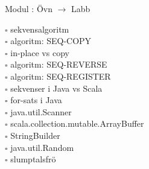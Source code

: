 
Modul : Övn  $\rightarrow$ Labb 
\begin{multicols}{3}\SlideFontTiny
$\square$ sekvensalgoritm \\
$\square$ algoritm: SEQ-COPY \\
$\square$ in-place vs copy \\
$\square$ algoritm: SEQ-REVERSE \\
$\square$ algoritm: SEQ-REGISTER \\
$\square$ sekvenser i Java vs Scala \\
$\square$ for-sats i Java \\
$\square$ java.util.Scanner \\
$\square$ scala.collection.mutable.ArrayBuffer \\
$\square$ StringBuilder \\
$\square$ java.util.Random \\
$\square$ slumptalsfrö \\     
\end{multicols}
